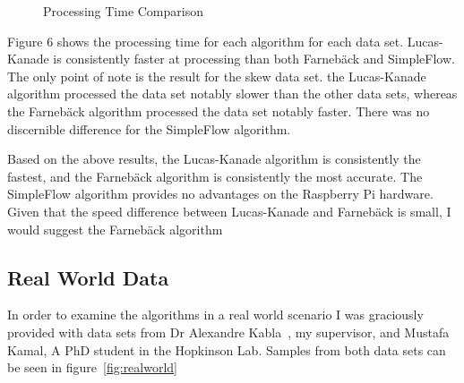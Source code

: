 \documentclass[a4paper,10pt]{article}
\begin{document}
      \begin{figure}[htbp!]
      \centering
        \label{fig:artitime}
        \caption{Processing Time Comparison}
      \end{figure}
      
      Figure 6 shows the processing time for each algorithm for each data set. Lucas-Kanade is consistently faster at processing than both Farnebäck and SimpleFlow. The only point of note is the result for the skew data set. the Lucas-Kanade algorithm processed the data set notably slower than the other data sets, whereas the Farnebäck algorithm processed the data set notably faster. There was no discernible difference for the SimpleFlow algorithm.
      
      Based on the above results, the Lucas-Kanade algorithm is consistently the fastest, and the Farnebäck algorithm is consistently the most accurate. The SimpleFlow algorithm provides no advantages on the Raspberry Pi hardware. Given that the speed difference between Lucas-Kanade and Farnebäck is small, I would suggest the Farnebäck algorithm 

    \subsection{Real World Data}
    
      In order to examine the algorithms in a real world scenario I was graciously provided with data sets from Dr Alexandre Kabla~\cite{harris2012characterizing}, my supervisor, and Mustafa Kamal, A PhD student in the Hopkinson Lab. Samples from both data sets can be seen in figure~\ref{fig:realworld}
      
\end{document}
